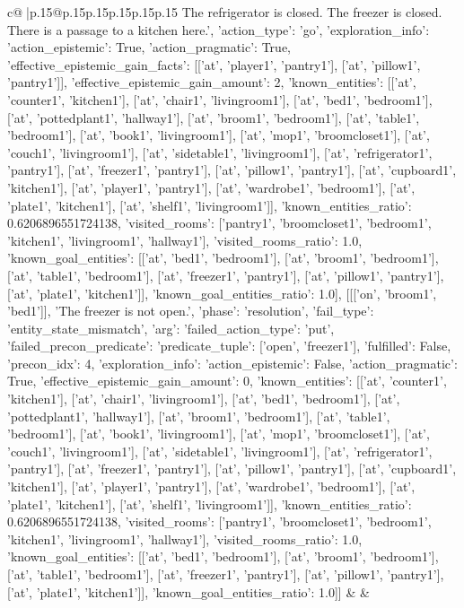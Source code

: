 \documentclass{article}
\begin{document}
{\begin{supertabular}{c@{$\;$}|p{.15\linewidth}@{}p{.15\linewidth}p{.15\linewidth}p{.15\linewidth}p{.15\linewidth}p{.15\linewidth}}
{{{The refrigerator is closed. The freezer is closed. There is a passage to a kitchen here.', {'action_type': 'go', 'exploration_info': {'action_epistemic': True, 'action_pragmatic': True, 'effective_epistemic_gain_facts': [['at', 'player1', 'pantry1'], ['at', 'pillow1', 'pantry1']], 'effective_epistemic_gain_amount': 2, 'known_entities': [['at', 'counter1', 'kitchen1'], ['at', 'chair1', 'livingroom1'], ['at', 'bed1', 'bedroom1'], ['at', 'pottedplant1', 'hallway1'], ['at', 'broom1', 'bedroom1'], ['at', 'table1', 'bedroom1'], ['at', 'book1', 'livingroom1'], ['at', 'mop1', 'broomcloset1'], ['at', 'couch1', 'livingroom1'], ['at', 'sidetable1', 'livingroom1'], ['at', 'refrigerator1', 'pantry1'], ['at', 'freezer1', 'pantry1'], ['at', 'pillow1', 'pantry1'], ['at', 'cupboard1', 'kitchen1'], ['at', 'player1', 'pantry1'], ['at', 'wardrobe1', 'bedroom1'], ['at', 'plate1', 'kitchen1'], ['at', 'shelf1', 'livingroom1']], 'known_entities_ratio': 0.6206896551724138, 'visited_rooms': ['pantry1', 'broomcloset1', 'bedroom1', 'kitchen1', 'livingroom1', 'hallway1'], 'visited_rooms_ratio': 1.0, 'known_goal_entities': [['at', 'bed1', 'bedroom1'], ['at', 'broom1', 'bedroom1'], ['at', 'table1', 'bedroom1'], ['at', 'freezer1', 'pantry1'], ['at', 'pillow1', 'pantry1'], ['at', 'plate1', 'kitchen1']], 'known_goal_entities_ratio': 1.0}}], [[['on', 'broom1', 'bed1']], 'The freezer is not open.', {'phase': 'resolution', 'fail_type': 'entity_state_mismatch', 'arg': {'failed_action_type': 'put', 'failed_precon_predicate': {'predicate_tuple': ['open', 'freezer1'], 'fulfilled': False, 'precon_idx': 4}}, 'exploration_info': {'action_epistemic': False, 'action_pragmatic': True, 'effective_epistemic_gain_amount': 0, 'known_entities': [['at', 'counter1', 'kitchen1'], ['at', 'chair1', 'livingroom1'], ['at', 'bed1', 'bedroom1'], ['at', 'pottedplant1', 'hallway1'], ['at', 'broom1', 'bedroom1'], ['at', 'table1', 'bedroom1'], ['at', 'book1', 'livingroom1'], ['at', 'mop1', 'broomcloset1'], ['at', 'couch1', 'livingroom1'], ['at', 'sidetable1', 'livingroom1'], ['at', 'refrigerator1', 'pantry1'], ['at', 'freezer1', 'pantry1'], ['at', 'pillow1', 'pantry1'], ['at', 'cupboard1', 'kitchen1'], ['at', 'player1', 'pantry1'], ['at', 'wardrobe1', 'bedroom1'], ['at', 'plate1', 'kitchen1'], ['at', 'shelf1', 'livingroom1']], 'known_entities_ratio': 0.6206896551724138, 'visited_rooms': ['pantry1', 'broomcloset1', 'bedroom1', 'kitchen1', 'livingroom1', 'hallway1'], 'visited_rooms_ratio': 1.0, 'known_goal_entities': [['at', 'bed1', 'bedroom1'], ['at', 'broom1', 'bedroom1'], ['at', 'table1', 'bedroom1'], ['at', 'freezer1', 'pantry1'], ['at', 'pillow1', 'pantry1'], ['at', 'plate1', 'kitchen1']], 'known_goal_entities_ratio': 1.0}}]] 
	  } 
	   } 
	   } 
	 & & \\ 
 


\end{supertabular}}
\end{document}
